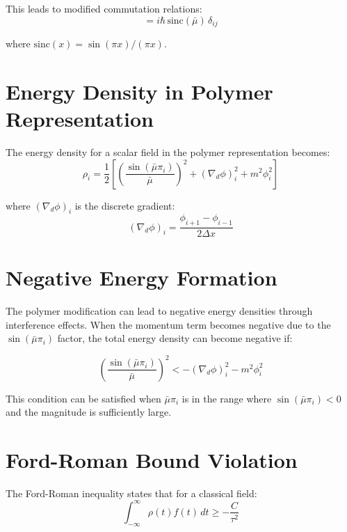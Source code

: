 \documentclass[12pt]{article}
\begin{document}
This leads to modified commutation relations:
\begin{equation}
[\hat{\phi}_i, \hat{\pi}_j^{\text{poly}}] = i\hbar \, \text{sinc}(\bar{\mu}) \, \delta_{ij}
\end{equation}

where $\text{sinc}(x) = \sin(\pi x)/(\pi x)$.

\section{Energy Density in Polymer Representation}

The energy density for a scalar field in the polymer representation becomes:
\begin{equation}
\rho_i = \frac{1}{2}\left[ \left(\frac{\sin(\bar{\mu} \pi_i)}{\bar{\mu}}\right)^2 + (\nabla_d \phi)_i^2 + m^2 \phi_i^2 \right]
\end{equation}

where $(\nabla_d \phi)_i$ is the discrete gradient:
\begin{equation}
(\nabla_d \phi)_i = \frac{\phi_{i+1} - \phi_{i-1}}{2\Delta x}
\end{equation}

\section{Negative Energy Formation}

The polymer modification can lead to negative energy densities through interference effects. When the momentum term becomes negative due to the $\sin(\bar{\mu} \pi_i)$ factor, the total energy density can become negative if:

\begin{equation}
\left(\frac{\sin(\bar{\mu} \pi_i)}{\bar{\mu}}\right)^2 < -(\nabla_d \phi)_i^2 - m^2 \phi_i^2
\end{equation}

This condition can be satisfied when $\bar{\mu} \pi_i$ is in the range where $\sin(\bar{\mu} \pi_i) < 0$ and the magnitude is sufficiently large.

\section{Ford-Roman Bound Violation}

The Ford-Roman inequality states that for a classical field:
\begin{equation}
\int_{-\infty}^{\infty} \rho(t) f(t) \, dt \geq -\frac{C}{\tau^2}
\end{equation}
\end{document}
